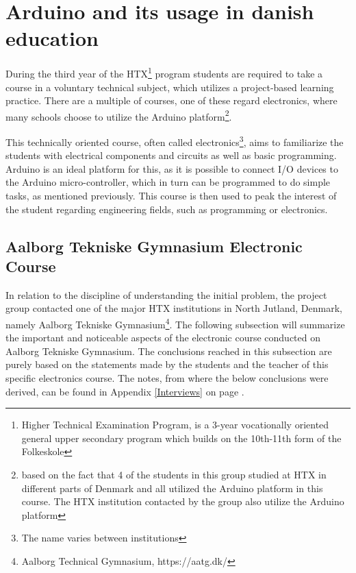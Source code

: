 
\section{Arduino and its usage in danish education}
During the third year of the HTX\footnote{Higher Technical Examination Program, is a 3-year vocationally oriented general upper secondary program which builds on the 10th-11th form of the Folkeskole\cite{htx_wiki}} program students are required to take a course in a voluntary technical subject, which utilizes a project-based learning practice. 
There are a multiple of courses, one of these regard electronics, where many schools choose to utilize the Arduino platform\footnote{based on the fact that 4 of the students in this group studied at HTX in different parts of Denmark and all utilized the Arduino platform in this course. 
The HTX institution contacted by the group also utilize the Arduino platform}\cite{holstebro_education}.

This technically oriented course, often called electronics\footnote{The name varies between institutions}, aims to familiarize the students with electrical components and circuits as well as basic programming\cite{holstebro_electronic}.
Arduino is an ideal platform for this, as it is possible to connect I/O devices to the Arduino micro-controller, which in turn can be programmed to do simple tasks, as mentioned previously. 
This course is then used to peak the interest of the student regarding engineering fields, such as programming or electronics.

\subsection{Aalborg Tekniske Gymnasium Electronic Course}
\label{htxinter}
In relation to the discipline of understanding the initial problem, the project group contacted one of the major HTX institutions in North Jutland, Denmark, namely Aalborg Tekniske Gymnasium\footnote{Aalborg Technical Gymnasium, https://aatg.dk/}. 
The following subsection will summarize the important and noticeable aspects of the electronic course conducted on Aalborg Tekniske Gymnasium. 
The conclusions reached in this subsection are purely based on the statements made by the students and the teacher of this specific electronics course.
The notes, from where the below conclusions were derived, can be found in Appendix \ref{Interviews} on page \pageref{Interviews}.

